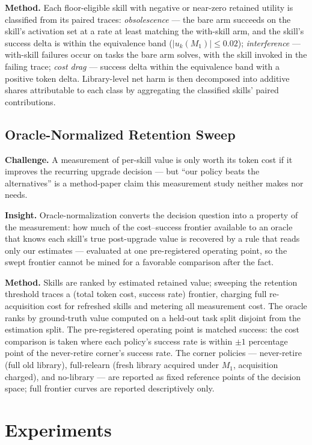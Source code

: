 \documentclass[11pt]{article}
\begin{document}
\textbf{Method.} Each floor-eligible skill with negative or near-zero retained utility is classified from its paired traces: \emph{obsolescence} --- the bare arm succeeds on the skill's activation set at a rate at least matching the with-skill arm, and the skill's success delta is within the equivalence band ($|u_k(M_1)| \leq 0.02$); \emph{interference} --- with-skill failures occur on tasks the bare arm solves, with the skill invoked in the failing trace; \emph{cost drag} --- success delta within the equivalence band with a positive token delta. Library-level net harm is then decomposed into additive shares attributable to each class by aggregating the classified skills' paired contributions.

\subsection{Oracle-Normalized Retention Sweep}

\textbf{Challenge.} A measurement of per-skill value is only worth its token cost if it improves the recurring upgrade decision --- but ``our policy beats the alternatives'' is a method-paper claim this measurement study neither makes nor needs.

\textbf{Insight.} Oracle-normalization converts the decision question into a property of the measurement: how much of the cost--success frontier available to an oracle that knows each skill's true post-upgrade value is recovered by a rule that reads only our estimates --- evaluated at one pre-registered operating point, so the swept frontier cannot be mined for a favorable comparison after the fact.

\textbf{Method.} Skills are ranked by estimated retained value; sweeping the retention threshold traces a (total token cost, success rate) frontier, charging full re-acquisition cost for refreshed skills and metering all measurement cost. The oracle ranks by ground-truth value computed on a held-out task split disjoint from the estimation split. The pre-registered operating point is matched success: the cost comparison is taken where each policy's success rate is within $\pm 1$ percentage point of the never-retire corner's success rate. The corner policies --- never-retire (full old library), full-relearn (fresh library acquired under $M_1$, acquisition charged), and no-library --- are reported as fixed reference points of the decision space; full frontier curves are reported descriptively only.

\section{Experiments}
\end{document}
